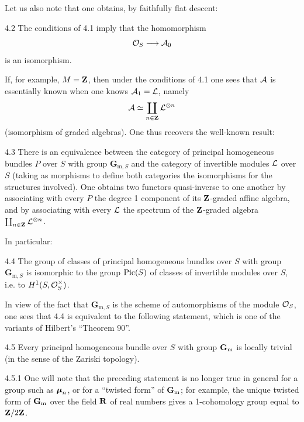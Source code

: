 Let us also note that one obtains, by faithfully flat descent:
\begin{corollary}{4.2}\label{VIII.4.2}
The conditions of 4.1 imply that the homomorphism
\[
\OS\to\cal A_0
\]
is an isomorphism.
\end{corollary}
If, for example, $M=\ZZ$, then under the conditions of 4.1 one sees that $\cal A$ is essentially known when one knows $\cal A_1=\cal L$, namely
\[
\cal A\simeq\coprod_{n\in\ZZ}\cal L^{\otimes n}
\]
(isomorphism of graded algebras). One thus recovers the well-known result:
\begin{corollary}{4.3}\label{VIII.4.3}
There is an equivalence between the category of principal homogeneous bundles $P$ over $S$ with group $\mathbf{G}_{\mathrm{m},S}$ and the category of invertible modules $\cal L$ over $S$ (taking as morphisms to define both categories the isomorphisms for the structures involved). One obtains two functors quasi-inverse to one another by associating with every $P$ the degree 1 component of its $\ZZ$-graded affine algebra, and by associating with every $\cal L$ the spectrum of the $\ZZ$-graded algebra $\coprod_{n\in\ZZ}\cal L^{\otimes n}$.
\end{corollary}
In particular:
\begin{corollary}{4.4}\label{VIII.4.4}
The group of classes of principal homogeneous bundles over $S$ with group $\mathbf{G}_{\mathrm{m},S}$ is isomorphic to the group $\Pic(S)$ of classes of invertible modules over $S$, i.e. to $H^1(S,\OS^\times)$.
\end{corollary}
In view of the fact that $\mathbf{G}_{\mathrm{m},S}$ is the scheme of automorphisms of the module $\OS$, one sees that 4.4 is equivalent to the following statement, which is one of the variants of Hilbert's ``Theorem 90''.
\begin{corollary}{4.5}\label{VIII.4.5}
Every principal homogeneous bundle over $S$ with group $\Gm$ is locally trivial (in the sense of the Zariski topology).
\end{corollary}
\begin{remark}{4.5.1}\label{VIII.4.5.1}
One will note that the preceding statement is no longer true in general for a group such as $\bmu_n$, or for a ``twisted form'' of $\Gm$; for example, the unique twisted form of $\Gm$ over the field $\RR$ of real numbers gives a 1-cohomology group equal to $\ZZ/2\ZZ$.
\end{remark}
